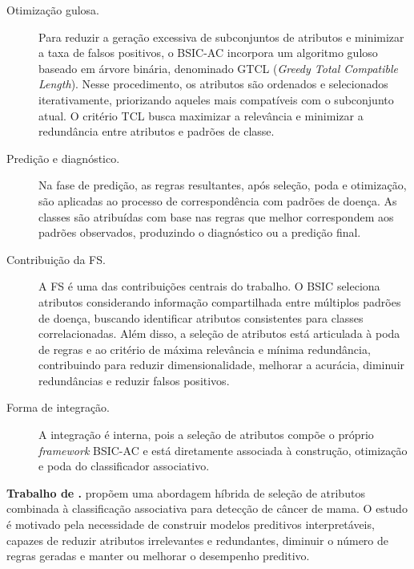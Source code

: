 \begin{description}
    \item[Otimização gulosa.] Para reduzir a geração excessiva de subconjuntos de atributos e minimizar a taxa de falsos positivos, o BSIC-AC incorpora um algoritmo guloso baseado em árvore binária, denominado GTCL (\textit{Greedy Total Compatible Length}). Nesse procedimento, os atributos são ordenados e selecionados iterativamente, priorizando aqueles mais compatíveis com o subconjunto atual. O critério TCL busca maximizar a relevância e minimizar a redundância entre atributos e padrões de classe.

    \item[Predição e diagnóstico.] Na fase de predição, as regras resultantes, após seleção, poda e otimização, são aplicadas ao processo de correspondência com padrões de doença. As classes são atribuídas com base nas regras que melhor correspondem aos padrões observados, produzindo o diagnóstico ou a predição final.

    \item[Contribuição da FS.] A FS é uma das contribuições centrais do trabalho. O BSIC seleciona atributos considerando informação compartilhada entre múltiplos padrões de doença, buscando identificar atributos consistentes para classes correlacionadas. Além disso, a seleção de atributos está articulada à poda de regras e ao critério de máxima relevância e mínima redundância, contribuindo para reduzir dimensionalidade, melhorar a acurácia, diminuir redundâncias e reduzir falsos positivos.

    \item[Forma de integração.] A integração é interna, pois a seleção de atributos compõe o próprio \textit{framework} BSIC-AC e está diretamente associada à construção, otimização e poda do classificador associativo.
\end{description}


\textbf{Trabalho de .} 
 propõem uma abordagem híbrida de seleção de atributos combinada à classificação associativa para detecção de câncer de mama. O estudo é motivado pela necessidade de construir modelos preditivos interpretáveis, capazes de reduzir atributos irrelevantes e redundantes, diminuir o número de regras geradas e manter ou melhorar o desempenho preditivo.

